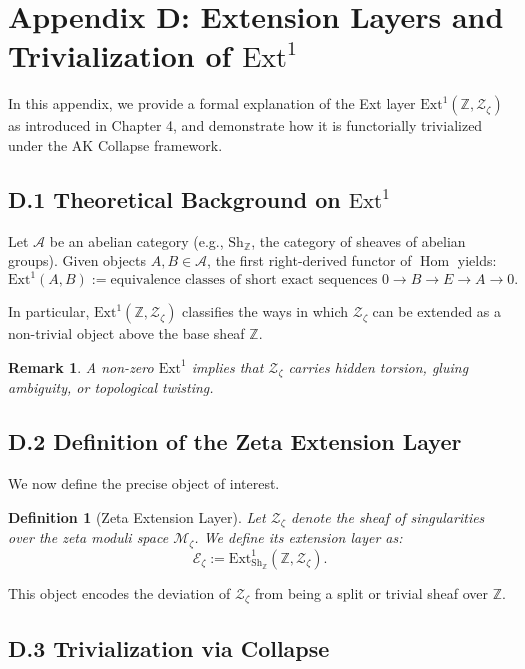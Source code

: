 \documentclass[11pt]{article}
\newtheorem{definition}[theorem]{Definition}
\newtheorem{remark}[theorem]{Remark}
\DeclareMathOperator{\Hom}{Hom}
\begin{document}
\section*{Appendix D: Extension Layers and Trivialization of $\mathrm{Ext}^1$}

In this appendix, we provide a formal explanation of the Ext layer $\mathrm{Ext}^1(\mathbb{Z}, \mathcal{Z}_\zeta)$  
as introduced in Chapter 4, and demonstrate how it is functorially trivialized under the AK Collapse framework.

\subsection*{D.1 Theoretical Background on $\mathrm{Ext}^1$}

Let $\mathcal{A}$ be an abelian category (e.g., $\text{Sh}_\mathbb{Z}$, the category of sheaves of abelian groups).  
Given objects $A, B \in \mathcal{A}$, the first right-derived functor of $\Hom$ yields:
\[
\mathrm{Ext}^1(A, B) := \text{equivalence classes of short exact sequences } 0 \to B \to E \to A \to 0.
\]

In particular, $\mathrm{Ext}^1(\mathbb{Z}, \mathcal{Z}_\zeta)$ classifies the ways in which $\mathcal{Z}_\zeta$ can be extended  
as a non-trivial object above the base sheaf $\mathbb{Z}$.

\begin{remark}
A non-zero $\mathrm{Ext}^1$ implies that $\mathcal{Z}_\zeta$ carries hidden torsion, gluing ambiguity, or topological twisting.
\end{remark}

\subsection*{D.2 Definition of the Zeta Extension Layer}

We now define the precise object of interest.

\begin{definition}[Zeta Extension Layer]
Let $\mathcal{Z}_\zeta$ denote the sheaf of singularities over the zeta moduli space $\mathcal{M}_\zeta$.  
We define its extension layer as:
\[
\mathcal{E}_\zeta := \mathrm{Ext}^1_{\text{Sh}_\mathbb{Z}}(\mathbb{Z}, \mathcal{Z}_\zeta).
\]
\end{definition}

This object encodes the deviation of $\mathcal{Z}_\zeta$ from being a split or trivial sheaf over $\mathbb{Z}$.

\subsection*{D.3 Trivialization via Collapse}
\end{document}
